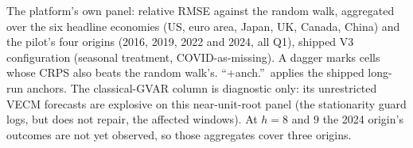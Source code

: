 \begin{table}[t]
\centering
\caption{The platform's own panel: relative RMSE against the random walk, aggregated over
the six headline economies (US, euro area, Japan, UK, Canada, China) and the pilot's four
origins (2016, 2019, 2022 and 2024, all Q1), shipped V3 configuration (seasonal
treatment, COVID-as-missing). A dagger marks cells whose CRPS also beats the random
walk's. ``+anch.''\ applies the shipped long-run anchors. The classical-GVAR column is
diagnostic only: its unrestricted VECM forecasts are explosive on this near-unit-root
panel (the stationarity guard logs, but does not repair, the affected windows). At
$h=8$ and $9$ the 2024 origin's outcomes are not yet observed, so those aggregates
cover three origins.}
\label{tab:ourpanel}
\footnotesize\setlength{\tabcolsep}{3.5pt}
\begin{center}

\end{center}
\end{table}

